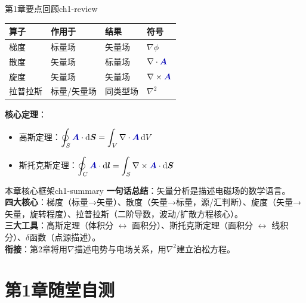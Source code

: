 \documentclass[11pt,a4paper,openany,oneside]{book}
\newcommand{\diff}{\mathrm{d}}
\newcommand{\vecA}{\textcolor{blue!70!black}{\vect{A}}}
\newcommand{\vect}[1]{\bm{#1}}
\newcommand{\grad}{\nabla}
\newcommand{\curl}{\nabla\times}
\newcommand{\divg}{\nabla\cdot}
\newcommand{\lap}{\nabla^2}
\begin{document}
\begin{review}{第1章要点回顾}{ch1-review}
\begin{center}
\small
\setlength{\tabcolsep}{2pt}
\begin{tabular}{@{}llll@{}}
\toprule
\textbf{算子} & \textbf{作用于} & \textbf{结果} & \textbf{符号} \\
\midrule
梯度 & 标量场 & 矢量场 & $\grad\phi$ \\
散度 & 矢量场 & 标量场 & $\divg\vecA$ \\
旋度 & 矢量场 & 矢量场 & $\curl\vecA$ \\
拉普拉斯 & 标量/矢量场 & 同类型场 & $\lap$ \\
\bottomrule
\end{tabular}
\end{center}

\textbf{核心定理}：
\begin{itemize}
\item 高斯定理：$\displaystyle\oint_S \vecA \cdot \diff\vect{S} = \int_V \divg\vecA \, \diff V$
\item 斯托克斯定理：$\displaystyle\oint_C \vecA \cdot \diff\vect{l} = \int_S \curl\vecA \cdot \diff\vect{S}$
\end{itemize}
\end{review}

\begin{tip}{本章核心框架}{ch1-summary}
\textbf{一句话总结}：矢量分析是描述电磁场的数学语言。\\
\textbf{四大核心}：梯度（标量→矢量）、散度（矢量→标量，源/汇判断）、旋度（矢量→矢量，旋转程度）、拉普拉斯（二阶导数，波动/扩散方程核心）。\\
\textbf{三大工具}：高斯定理（体积分 $\leftrightarrow$ 面积分）、斯托克斯定理（面积分 $\leftrightarrow$ 线积分）、$\delta$函数（点源描述）。\\
\textbf{衔接}：第2章将用$\grad$描述电势与电场关系，用$\lap$建立泊松方程。
\end{tip}

\section*{第1章随堂自测}
\end{document}
